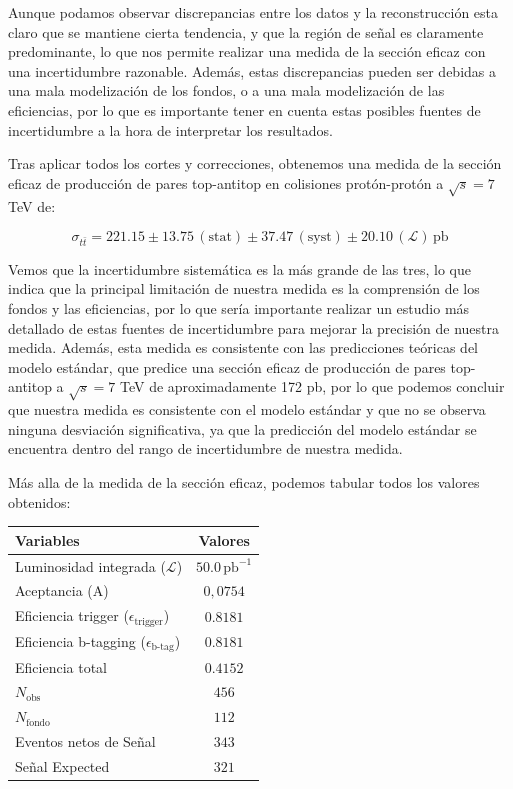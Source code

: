 \documentclass[9pt,a4paper,twocolumn,twoside]{rho-class/rho}
\begin{document}
Aunque podamos observar discrepancias entre los datos y la reconstrucción esta claro que se mantiene cierta tendencia, y que la región de señal es claramente predominante, lo que nos permite realizar una medida de la sección eficaz con una incertidumbre razonable. Además, estas discrepancias pueden ser debidas a una mala modelización de los fondos, o a una mala modelización de las eficiencias, por lo que es importante tener en cuenta estas posibles fuentes de incertidumbre a la hora de interpretar los resultados.

Tras aplicar todos los cortes y correcciones, obtenemos una medida de la sección eficaz de producción de pares top-antitop en colisiones protón-protón a $\sqrt{s} = 7$ TeV de:

\begin{equation}
    \sigma_{t\bar{t}} = 221.15 \pm 13.75 \, (\mathrm{stat}) \pm 37.47 \, (\mathrm{syst}) \pm 20.10 \, (\mathcal{L}) \, \mathrm{pb}
\end{equation}
\vspace{0.05cm}

Vemos que la incertidumbre sistemática es la más grande de las tres, lo que indica que la principal limitación de nuestra medida es la comprensión de los fondos y las eficiencias, por lo que sería importante realizar un estudio más detallado de estas fuentes de incertidumbre para mejorar la precisión de nuestra medida. Además, esta medida es consistente con las predicciones teóricas del modelo estándar, que predice una sección eficaz de producción de pares top-antitop a $\sqrt{s} = 7$ TeV de aproximadamente 172 pb, por lo que podemos concluir que nuestra medida es consistente con el modelo estándar y que no se observa ninguna desviación significativa, ya que la predicción del modelo estándar se encuentra dentro del rango de incertidumbre de nuestra medida.

Más alla de la medida de la sección eficaz, podemos tabular todos los valores obtenidos:

\begin{table}[hbt!]
    \centering
    \begin{tabular}{|l|c|}
        \hline
        Variables & Valores \\
        \hline
        Luminosidad integrada ($\mathcal{L}$)  & $50.0 \, \mathrm{pb}^{-1}$ \\
        \hline
        Aceptancia (A)  & $0,0754$ \\
        \hline
        Eficiencia trigger ($\epsilon_{\text{trigger}}$)  & $0.8181$ \\
        \hline
        Eficiencia b-tagging ($\epsilon_{\text{b-tag}}$)  & $0.8181$ \\
        \hline
        Eficiencia total  & $0.4152$ \\
        \hline
        $N_{\text{obs}}$  & $456$ \\
        \hline
        $N_{\text{fondo}}$  & $112$ \\
        \hline
        Eventos netos de Señal  & $343$ \\
        \hline
        Señal Expected & $321$ \\
        \hline
    \end{tabular}
\end{table}
\end{document}
